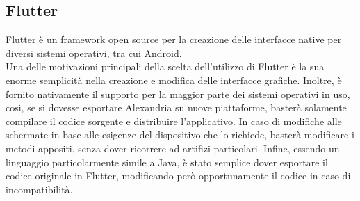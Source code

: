 {\raggedright{\subsection{Flutter}}
Flutter è un framework open source per la creazione delle interfacce native per diversi sistemi operativi, tra cui Android. \\
Una delle motivazioni principali della scelta dell'utilizzo di Flutter è la sua enorme semplicità nella creazione e modifica delle interfacce grafiche. Inoltre, è fornito nativamente il supporto per la maggior parte dei sistemi operativi in uso, così, se si dovesse esportare Alexandria su nuove piattaforme, basterà solamente compilare il codice sorgente e distribuire l'applicativo. In caso di modifiche alle schermate in base alle esigenze del dispositivo che lo richiede, basterà modificare i metodi appositi, senza dover ricorrere ad artifizi particolari. Infine, essendo un linguaggio particolarmente simile a Java, è stato semplice dover esportare il codice originale in Flutter, modificando però opportunamente il codice in caso di incompatibilità.

\newpage

}
